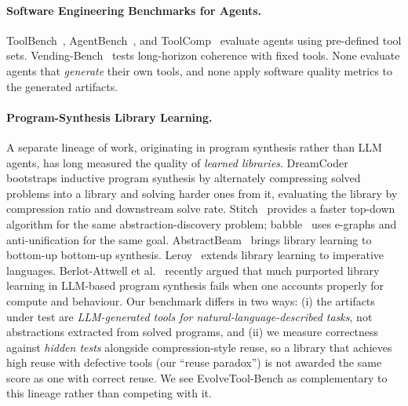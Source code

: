 \documentclass[sigconf,anonymous,review,natbib=false]{acmart}
\begin{document}
\paragraph{Software Engineering Benchmarks for Agents.} ToolBench~\cite{qin2023toolbench}, AgentBench~\cite{liu2024agentbench}, and ToolComp~\cite{toolcomp2025} evaluate agents using pre-defined tool sets. Vending-Bench~\cite{backlund2025vendingbench} tests long-horizon coherence with fixed tools. None evaluate agents that \emph{generate} their own tools, and none apply software quality metrics to the generated artifacts.

\paragraph{Program-Synthesis Library Learning.} A separate lineage of work, originating in program synthesis rather than LLM agents, has long measured the quality of \emph{learned libraries}. DreamCoder~\cite{ellis2021dreamcoder} bootstraps inductive program synthesis by alternately compressing solved problems into a library and solving harder ones from it, evaluating the library by compression ratio and downstream solve rate. Stitch~\cite{bowers2023stitch} provides a faster top-down algorithm for the same abstraction-discovery problem; babble~\cite{cao2023babble} uses e-graphs and anti-unification for the same goal. AbstractBeam~\cite{zenkner2024abstractbeam} brings library learning to bottom-up bottom-up synthesis. Leroy~\cite{bellur2024leroy} extends library learning to imperative languages. Berlot-Attwell et al.~\cite{berlotattwell2026} recently argued that much purported library learning in LLM-based program synthesis fails when one accounts properly for compute and behaviour. Our benchmark differs in two ways: (i) the artifacts under test are \emph{LLM-generated tools for natural-language-described tasks}, not abstractions extracted from solved programs, and (ii) we measure correctness against \emph{hidden tests} alongside compression-style reuse, so a library that achieves high reuse with defective tools (our ``reuse paradox'') is not awarded the same score as one with correct reuse. We see EvolveTool-Bench as complementary to this lineage rather than competing with it.
\end{document}

